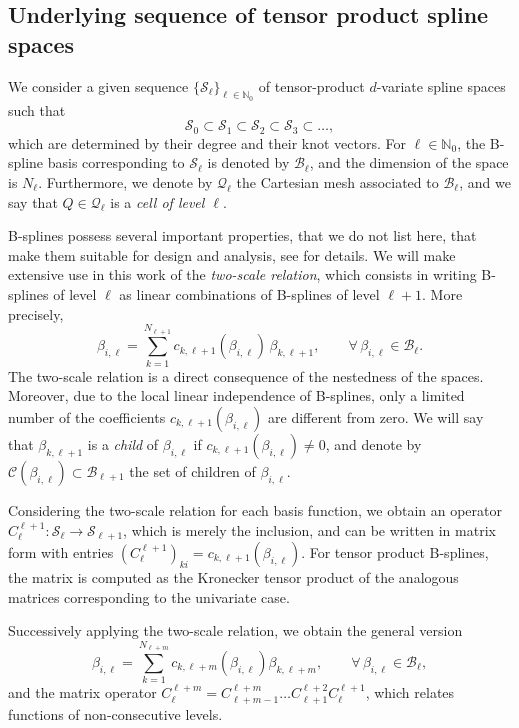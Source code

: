 \documentclass[a4paper]{siamltex1213}
\newcommand{\Rd}{\color{red}}
\newcommand\NN{\mathbb N}
\newcommand\BB{\mathcal B}
\newcommand\QQ{\mathcal Q}
\newcommand\VV{\mathcal S}
\newcommand\CC{\mathcal C}
\begin{document}
\subsection{Underlying sequence of tensor product spline spaces} \label{sec:B-splines}
We consider a given sequence $\{\VV_\ell\}_{\ell \in\NN_0}$ of tensor-product $d$-variate spline spaces such that
\begin{equation}\label{E:tensor-product spaces}
 \VV_0\subset \VV_1\subset \VV_2\subset\VV_3\subset\dots,
\end{equation}
which are determined by their degree and their knot vectors. 
For $\ell\in\NN_0$, the B-spline basis corresponding to $\VV_\ell$ is denoted by $\BB_\ell$, and the dimension of the space is $N_\ell$. Furthermore, we denote by $\QQ_\ell$ the Cartesian mesh associated to $\BB_\ell$, and we say that $Q\in\QQ_\ell$ is a \emph{cell of level $\ell$}.

B-splines possess several important properties, that we do not list here, that make them suitable for design and analysis, see \cite{DeBoor, Schumi,IGA-book} for details. We will make extensive use in this work of the \emph{two-scale relation}, which consists in writing B-splines of level $\ell$ as linear combinations of B-splines of level $\ell+1$. More precisely, 
\begin{equation} \label{E:two scale relation}
 \beta_{i,\ell} = \sum_{k=1}^{N_{\ell+1}}
c_{k,\ell+1}(\beta_{i,\ell}) \, \beta_{k,\ell+1}, 
\qquad \forall\,\beta_{i,\ell} \in\BB_\ell.
\end{equation}
The two-scale relation is a direct consequence of the nestedness of the spaces. Moreover, due to the local linear independence of B-splines, only a limited number of the coefficients $c_{k,\ell+1}(\beta_{i,\ell})$ are different from zero. We will say that $\beta_{k,\ell+1}$ is a \emph{child} of $\beta_{i,\ell}$ if $c_{k,\ell+1}(\beta_{i,\ell}) \ne 0$, and denote by $\CC(\beta_{i,\ell})\subset\BB_{\ell+1}$ the set of children of $\beta_{i,\ell}$.

Considering the two-scale relation for each basis function, we obtain an operator $C_\ell^{\ell+1}: \VV_\ell \longrightarrow \VV_{\ell+1}$, which is merely the inclusion, and can be written in matrix form {\Rd with entries $(C_\ell^{\ell+1})_{ki} = c_{k,\ell+1}(\beta_{i,\ell})$.} For tensor product B-splines, the matrix is computed as the Kronecker tensor product of the analogous matrices corresponding to the univariate case.

Successively applying the two-scale relation, we obtain the general version
\begin{equation} \label{E:two-scale-many-levels}
 \beta_{i,\ell} = \sum_{k=1}^{N_{\ell+m}}
c_{k,\ell+m}(\beta_{i,\ell})\beta_{k,\ell+m}, 
\qquad \forall\,\beta_{i,\ell} \in\BB_\ell,
\end{equation}
and the matrix operator $C_\ell^{\ell+m} = C_{\ell+m-1}^{\ell+m} \ldots C_{\ell+1}^{\ell+2} C_\ell^{\ell+1}$, which relates functions of non-consecutive levels.
\end{document}
